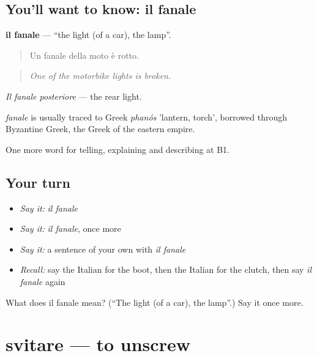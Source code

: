 \subsection*{You'll want to know: il fanale}
\textbf{il fanale} — \textquotedblleft{}the light (of a car), the lamp\textquotedblright{}.

\begin{quote}
Un fanale della moto è rotto.
\end{quote}

\begin{quote}
\emph{One of the motorbike lights is broken.}
\end{quote}

\emph{Il fanale posteriore} — the rear light.

\begin{cousinweb}
\emph{fanale} is usually traced to Greek \emph{phanós} 'lantern, torch', borrowed through Byzantine Greek, the Greek of the eastern empire.
\end{cousinweb}

\begin{grammarlens}[title={What you've built}]
One more word for telling, explaining and describing at B1.
\end{grammarlens}

\subsection*{Your turn}
\begin{itemize}
\raggedright
  \item \emph{Say it:} \emph{il fanale}
  \item \emph{Say it:} \emph{il fanale}, once more
  \item \emph{Say it:} a sentence of your own with \emph{il fanale}
  \item \emph{Recall:} say the Italian for the boot, then the Italian for the clutch, then say \emph{il fanale} again
\end{itemize}

\begin{tcolorbox}[breakable,colback=teal!4,colframe=teal!35!black,title={Before you move on}]
What does il fanale mean? (\textquotedblleft{}The light (of a car), the lamp\textquotedblright{}.) Say it once more.
\end{tcolorbox}
\section[svitare]{svitare — to unscrew}


